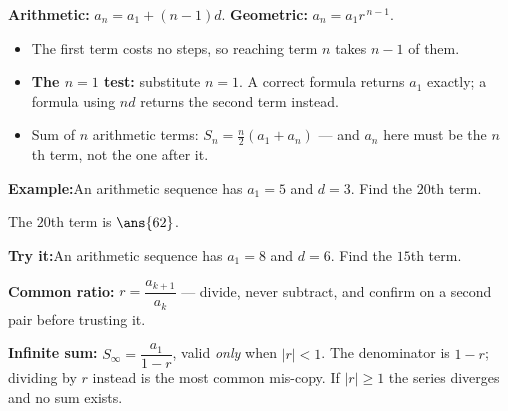 \documentclass[12pt]{article}
\begin{document}


\begin{formulabox}
\textbf{Arithmetic:} $a_n = a_1 + (n-1)d$. \qquad
\textbf{Geometric:} $a_n = a_1 r^{\,n-1}$.
\begin{itemize}[leftmargin=0.8cm, itemsep=1pt, topsep=2pt]
  \item The first term costs no steps, so reaching term $n$ takes $n-1$ of them.
  \item \textbf{The $n=1$ test:} substitute $n = 1$. A correct formula returns
        $a_1$ exactly; a formula using $nd$ returns the second term instead.
  \item Sum of $n$ arithmetic terms: $S_n = \frac{n}{2}(a_1 + a_n)$ --- and
        $a_n$ here must be the $n$th term, not the one after it.
\end{itemize}
\end{formulabox}

\begin{examplebox}
\textbf{Example:}\quad An arithmetic sequence has $a_1 = 5$ and $d = 3$. Find the
$20$th term.

The $20$th term is $\ans{62}$.
\end{examplebox}

\begin{tryitbox}
\textbf{Try it:}\quad An arithmetic sequence has $a_1 = 8$ and $d = 6$. Find the
$15$th term.\\[2pt]
\end{tryitbox}


\begin{formulabox}
\textbf{Common ratio:} $r = \dfrac{a_{k+1}}{a_k}$ --- divide, never subtract, and
confirm on a second pair before trusting it.\par
\smallskip
\textbf{Infinite sum:} $S_\infty = \dfrac{a_1}{1-r}$, valid \emph{only} when
$|r| < 1$. The denominator is $1-r$; dividing by $r$ instead is the most common
mis-copy. If $|r| \geq 1$ the series diverges and no sum exists.
\end{formulabox}
\end{document}
